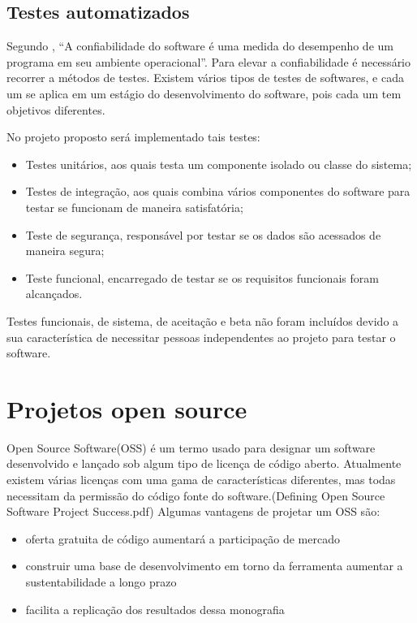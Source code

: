 \subsection{Testes automatizados}

Segundo \cite{mathur1991performance}, “A confiabilidade do software é uma medida do desempenho de um programa em seu ambiente operacional”. Para elevar a confiabilidade é necessário recorrer a métodos de testes. Existem vários tipos de testes de softwares, e cada um se aplica em um estágio do desenvolvimento do software, pois cada um tem objetivos diferentes\cite{nidhra2012black}. \par
No projeto proposto será implementado tais testes: \par
\begin{itemize}  
\item Testes unitários, aos quais testa um componente isolado ou classe do sistema;
\item Testes de integração, aos quais combina vários componentes do software para testar se funcionam de maneira satisfatória;
\item Teste de segurança, responsável por testar se os dados são acessados de maneira segura;
\item Teste funcional, encarregado de testar se os requisitos funcionais foram alcançados.
\end{itemize}
Testes funcionais, de sistema, de aceitação e beta não foram incluídos devido a sua característica de necessitar pessoas independentes ao projeto para testar o software.

\section{Projetos open source}
Open Source Software(OSS) é um termo usado para designar um software desenvolvido e lançado sob algum tipo de licença de código aberto. Atualmente existem várias licenças com uma gama de características diferentes, mas todas necessitam da permissão do código fonte do software.(Defining Open Source Software Project Success.pdf)
Algumas vantagens de projetar um OSS são:
\begin{itemize}  
\item oferta gratuita de código aumentará a participação de mercado\cite{fitzgerald2006transformation}
\item construir uma base de desenvolvimento em torno da ferramenta aumentar a sustentabilidade a longo prazo\cite{nyman2011forking}
\item facilita a replicação dos resultados dessa monografia\cite{heron2013open}
\end{itemize}


